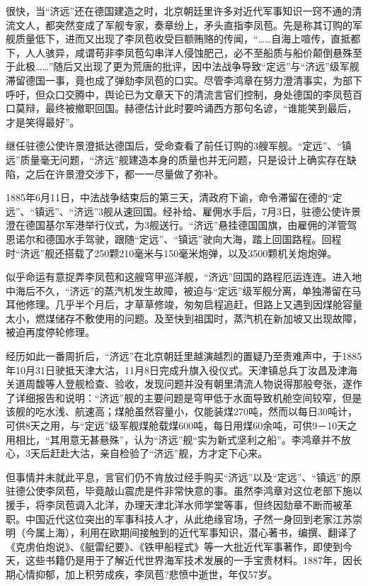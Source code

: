 \documentclass[12pt,UTF8]{ctexbook}
\begin{document}
很快，当“济远”还在德国建造之时，北京朝廷里许多对近代军事知识一窍不通的清流文人，都突然变成了军舰专家，奏章纷上，矛头直指李凤苞。先是称其订购的军舰质量低下，进而又出现了李凤苞收受巨额贿赂的传闻，“……自海上喧传，直抵都下，人人骇异，咸谓苟非李凤苞勾串洋人侵蚀肥己，必不至船质与船价颠倒悬殊至于此极……”随后又出现了更为荒唐的批评，因中法战争导致“定远”与“济远”级军舰滞留德国一事，竟也成了弹劾李凤苞的口实。尽管李鸿章在努力澄清事实，为部下呼吁，但众口交腾中，舆论已为文章天下的清流言官们控制，身处德国的李凤苞百口莫辩，最终被撤职回国。赫德估计此时要吟诵西方那句名谚，“谁能笑到最后，才是笑得最好”。

继任驻德公使许景澄抵达德国后，受命查看了前任订购的3艘军舰。“定远”、“镇远”质量毫无问题，“济远”舰建造本身的质量也并无问题，只是设计上确实存在缺陷，之后在许景澄交涉下，都一一尽量做了弥补。

1885年6月11日，中法战争结束后的第三天，清政府下谕，命令滞留在德的“定远”、“镇远”、“济远”3舰从速回国。经补给、雇佣水手后，7月3日，驻德公使许景澄在德国基尔军港举行仪式，为3舰送行。“济远”悬挂德国国旗，由雇佣的洋管驾恩诺尔和德国水手驾驶，跟随“定远”、“镇远”驶向大海，踏上回国路程。回程时“济远”舰还搭载了250颗210毫米与150毫米炮弹，以及3500颗机关炮炮弹。

似乎命运有意捉弄李凤苞和这艘穹甲巡洋舰，“济远”回国的路程厄运连连。进入地中海后不久，“济远”的蒸汽机发生故障，被迫与“定远”级军舰分离，单独滞留在马耳他修理。几乎半个月后，才草草修竣，匆匆启程追赶，但路上又遇到因煤舱容量太小，燃煤储存不敷使用的问题。及至快到祖国时，蒸汽机在新加坡又出现故障，被迫再度停轮修理。

经历如此一番周折后，“济远”在北京朝廷里越演越烈的置疑乃至责难声中，于1885年10月31日驶抵天津大沽，11月8日完成升旗入役仪式。天津镇总兵丁汝昌及津海关道周馥等人登舰检查、验收，发现问题并没有朝里清流人物说得那般夸张，遂作了详细报告和说明：“济远”舰的主要问题是穹甲低于水面导致机舱空间较窄，但是该舰的吃水浅、航速高；煤舱虽然容量小，仅能装煤270吨，然而以每日30吨计，可供8天之用，与“定远”级军舰煤舱载煤600吨，每日用煤60余吨，可供9－10天之用相比，“其用意无甚悬殊”，认为“济远”舰“实为新式坚利之船”。李鸿章并不放心，3天后赶赴大沽，亲自检验了“济远”舰，方才定下心来。

但事情并未就此平息，言官们仍不肯放过经手购买“济远”以及“定远”、“镇远”的原驻德公使李凤苞，毕竟敲山震虎是件非常快意的事。虽然李鸿章对这位老部下施以援手，将李凤苞调入北洋，办理天津北洋水师学堂等事，但终因劾章不断而被革职。中国近代这位突出的军事科技人才，从此绝缘官场，孑然一身回到老家江苏崇明（今属上海），利用在欧期间接触到的近代军事知识，潜心著书，编撰、翻译了《克虏伯炮说》、《艇雷纪要》、《铁甲船程式》等一大批近代军事著作，即使到今天，这些书籍仍是用于了解近代世界海军技术发展的一手宝贵材料。1887年，因长期心情抑郁，加上积劳成疾，李凤苞?悲愤中逝世，年仅57岁。
\end{document}
